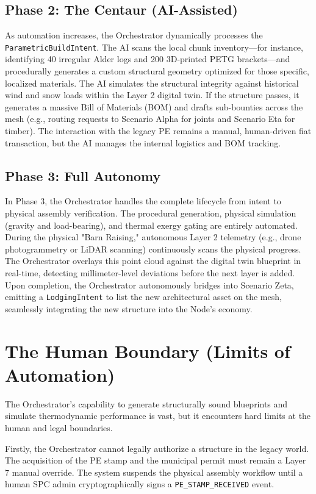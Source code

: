 \subsection{Phase 2: The Centaur (AI-Assisted)}
As automation increases, the Orchestrator dynamically processes the \texttt{ParametricBuildIntent}. The AI scans the local chunk inventory---for instance, identifying 40 irregular Alder logs and 200 3D-printed PETG brackets---and procedurally generates a custom structural geometry optimized for those specific, localized materials. 
The AI simulates the structural integrity against historical wind and snow loads within the Layer 2 digital twin. If the structure passes, it generates a massive Bill of Materials (BOM) and drafts sub-bounties across the mesh (e.g., routing requests to Scenario Alpha for joints and Scenario Eta for timber). The interaction with the legacy PE remains a manual, human-driven fiat transaction, but the AI manages the internal logistics and BOM tracking.

\subsection{Phase 3: Full Autonomy}
In Phase 3, the Orchestrator handles the complete lifecycle from intent to physical assembly verification. The procedural generation, physical simulation (gravity and load-bearing), and thermal exergy gating are entirely automated. 
During the physical "Barn Raising," autonomous Layer 2 telemetry (e.g., drone photogrammetry or LiDAR scanning) continuously scans the physical progress. The Orchestrator overlays this point cloud against the digital twin blueprint in real-time, detecting millimeter-level deviations before the next layer is added. Upon completion, the Orchestrator autonomously bridges into Scenario Zeta, emitting a \texttt{LodgingIntent} to list the new architectural asset on the mesh, seamlessly integrating the new structure into the Node's economy.

\section{The Human Boundary (Limits of Automation)}
The Orchestrator's capability to generate structurally sound blueprints and simulate thermodynamic performance is vast, but it encounters hard limits at the human and legal boundaries.

Firstly, the Orchestrator cannot legally authorize a structure in the legacy world. The acquisition of the PE stamp and the municipal permit must remain a Layer 7 manual override. The system suspends the physical assembly workflow until a human SPC admin cryptographically signs a \texttt{PE\_STAMP\_RECEIVED} event.

